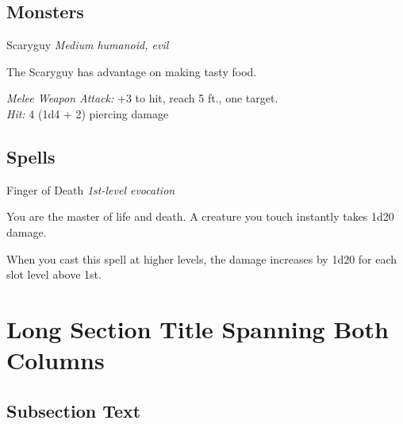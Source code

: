 \documentclass[10pt,twoside]{book}
\begin{document}
\begin{multicols}{2}
\newpage %

\subsection{Monsters}
\begin{monsterbox}{Scaryguy}{}
    \textit{Medium humanoid, evil} \\
    \basics[armorclass=12, hitpoints=16 (3d8+3), speed=50 ft]
    \stats[STR = 12 (+1), DEX = 14 (+2), CON = 13 (+1), 
           INT = 8 (-1),  WIS = 10 (+0), CHA = 7 (-2)]
    
    \details[ %
        skills = Perception +2,
        savingthrows = Dex +4,
        languages = {Common, Abyssal},
        challenge = 1/2 (100 xp)
    ]
    
    \begin{monsteraction}
        The Scaryguy has advantage on making tasty food.
    \end{monsteraction}

    \begin{monsteraction}[Shortsword]
        \textit{Melee Weapon Attack:} +3 to hit, reach 5 ft., one target.\\
        \textit{Hit:} 4 (1d4 + 2) piercing damage
    \end{monsteraction}
\end{monsterbox}

\subsection{Spells}
\begin{spellbox}{Finger of Death}
    \textit{1st-level evocation}\\
    \requirements[ %
        castingtime=1 action,
        range=Touch,
        components={V, S},
        duration=Instantaneous
    ]
    
    You are the master of life and death. A creature you touch instantly
    takes 1d20 damage.

    \begin{spellaction}
        When you cast this spell at higher levels, the damage increases by
        1d20 for each slot level above 1st.
    \end{spellaction}
\end{spellbox}

\newpage \clearpage

\end{multicols}
\section{Long Section Title Spanning Both Columns}
\begin{multicols}{2}

\lipsum[1-2]

\subsection{Subsection Text}
\lipsum[3-10]

\end{multicols}
\end{document}
